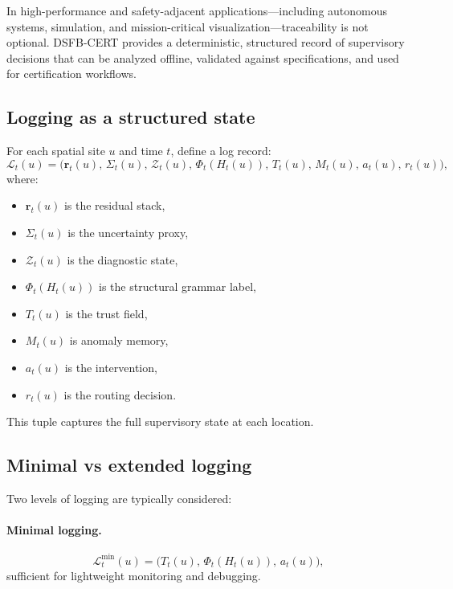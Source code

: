 \documentclass[11pt,letterpaper]{article}
\theoremstyle{gcresult}
\theoremstyle{definition}
\begin{document}
In high-performance and safety-adjacent applications—including autonomous systems, simulation, and mission-critical visualization—traceability is not optional. DSFB-CERT provides a deterministic, structured record of supervisory decisions that can be analyzed offline, validated against specifications, and used for certification workflows.


\subsection{Logging as a structured state}

For each spatial site $u$ and time $t$, define a log record:
\begin{equation}
\mathcal{L}_t(u)=
\bigl(
\mathbf r_t(u),\,
\Sigma_t(u),\,
\mathcal{Z}_t(u),\,
\Phi_t(H_t(u)),\,
T_t(u),\,
M_t(u),\,
a_t(u),\,
r_t(u)
\bigr),
\end{equation}
where:
\begin{itemize}[leftmargin=1.5em]
    \item $\mathbf r_t(u)$ is the residual stack,
    \item $\Sigma_t(u)$ is the uncertainty proxy,
    \item $\mathcal{Z}_t(u)$ is the diagnostic state,
    \item $\Phi_t(H_t(u))$ is the structural grammar label,
    \item $T_t(u)$ is the trust field,
    \item $M_t(u)$ is anomaly memory,
    \item $a_t(u)$ is the intervention,
    \item $r_t(u)$ is the routing decision.
\end{itemize}

This tuple captures the full supervisory state at each location.


\subsection{Minimal vs extended logging}

Two levels of logging are typically considered:

\paragraph{Minimal logging.}
\begin{equation}
\mathcal{L}^{\mathrm{min}}_t(u)=\bigl(T_t(u),\,\Phi_t(H_t(u)),\,a_t(u)\bigr),
\end{equation}
sufficient for lightweight monitoring and debugging.
\end{document}
